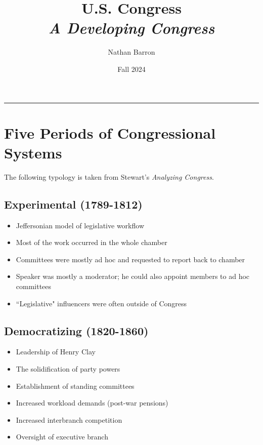 \documentclass[10pt]{article}
\title{\textbf{U.S. Congress}\\\textit{A Developing Congress}}
\author{Nathan Barron}
\date{Fall 2024}
\begin{document}
\maketitle
\tableofcontents
\vspace{.25in}
\hrule
\vspace{.25in}

\section{Five Periods of Congressional Systems}

The following typology is taken from Stewart's \textit{Analyzing Congress}.

\subsection{Experimental (1789-1812)}
\begin{itemize}
    \item Jeffersonian model of legislative workflow 
    \item Most of the work occurred in the whole chamber
    \item Committees were mostly ad hoc and requested to report back to chamber
    \item Speaker was mostly a moderator; he could also appoint members to ad hoc committees
    \item ``Legislative" influencers were often outside of Congress
\end{itemize}



\subsection{Democratizing (1820-1860)}
\begin{itemize}
    \item Leadership of Henry Clay
    \item The solidification of party powers
    \item Establishment of standing committees
    \item Increased workload demands (post-war pensions)
    \item Increased interbranch competition
    \item Oversight of executive branch
\end{itemize}
\end{document}
